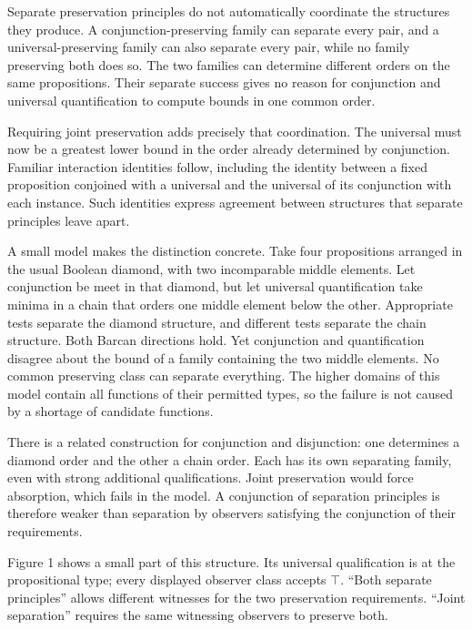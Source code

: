 \documentclass[12pt,letterpaper]{article}
\begin{document}
Separate preservation principles do not automatically coordinate the structures they produce. A conjunction-preserving family can separate every pair, and a universal-preserving family can also separate every pair, while no family preserving both does so. The two families can determine different orders on the same propositions. Their separate success gives no reason for conjunction and universal quantification to compute bounds in one common order.


Requiring joint preservation adds precisely that coordination. The universal must now be a greatest lower bound in the order already determined by conjunction. Familiar interaction identities follow, including the identity between a fixed proposition conjoined with a universal and the universal of its conjunction with each instance. Such identities express agreement between structures that separate principles leave apart.~\cite[\S3]{r3}


A small model makes the distinction concrete. Take four propositions arranged in the usual Boolean diamond, with two incomparable middle elements. Let conjunction be meet in that diamond, but let universal quantification take minima in a chain that orders one middle element below the other. Appropriate tests separate the diamond structure, and different tests separate the chain structure. Both Barcan directions hold. Yet conjunction and quantification disagree about the bound of a family containing the two middle elements. No common preserving class can separate everything. The higher domains of this model contain all functions of their permitted types, so the failure is not caused by a shortage of candidate functions.~\cite[\S5]{r3}


There is a related construction for conjunction and disjunction: one determines a diamond order and the other a chain order. Each has its own separating family, even with strong additional qualifications. Joint preservation would force absorption, which fails in the model. A conjunction of separation principles is therefore weaker than separation by observers satisfying the conjunction of their requirements.~\cite{r5}


Figure 1 shows a small part of this structure. Its universal qualification is at the propositional type; every displayed observer class accepts $\top$. ``Both separate principles'' allows different witnesses for the two preservation requirements. ``Joint separation'' requires the same witnessing observers to preserve both.
\end{document}

